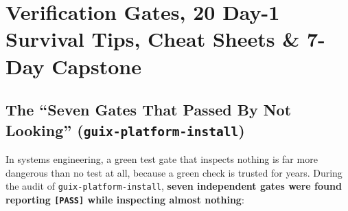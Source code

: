 \documentclass[11pt,oneside]{book}
\begin{document}
\chapter{Verification Gates, 20 Day-1 Survival Tips, Cheat Sheets \& 7-Day Capstone}

\section{The ``Seven Gates That Passed By Not Looking'' (\texttt{guix-platform-install})}

In systems engineering, a green test gate that inspects nothing is far more dangerous than no test at all, because a green check is trusted for years. During the audit of \texttt{guix-platform-install}, \textbf{seven independent gates were found reporting \texttt{[PASS]} while inspecting almost nothing}:
\end{document}
